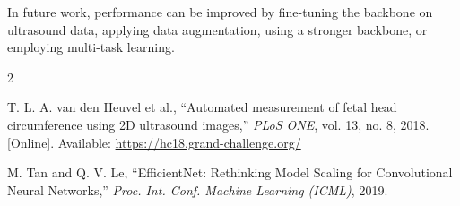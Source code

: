 \documentclass[conference]{IEEEtran}
\begin{document}
In future work, performance can be improved by fine-tuning the backbone on ultrasound data, applying data augmentation, using a stronger backbone, or employing multi-task learning.


\begin{thebibliography}{2}

T. L. A. van den Heuvel et al.,
``Automated measurement of fetal head circumference using 2D ultrasound images,''
\textit{PLoS ONE}, vol. 13, no. 8, 2018.
[Online]. Available: \url{https://hc18.grand-challenge.org/}

M. Tan and Q. V. Le,
``EfficientNet: Rethinking Model Scaling for Convolutional Neural Networks,''
\textit{Proc. Int. Conf. Machine Learning (ICML)}, 2019.

\end{thebibliography}
\end{document}
